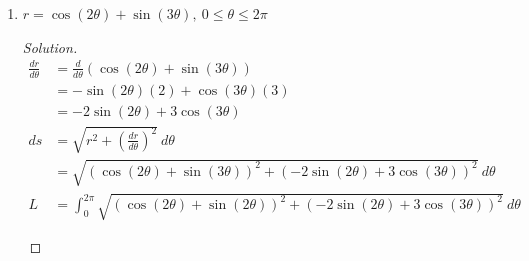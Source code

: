 \documentclass[12pt]{article}
\begin{document}
\begin{enumerate}
			\item[3.] \(\displaystyle r=\cos\left(2\theta\right)+\sin\left(3\theta\right),~0\leq \theta\leq 2\pi\)
			\begin{proof}[Solution]
				\begin{align*}
					\frac{dr}{d\theta} & = \frac{d}{d\theta} \left(\cos\left(2\theta\right)+\sin\left(3\theta\right)\right) \\
					& = -\sin\left(2\theta\right)\left(2\right)+\cos \left(3\theta\right)\left(3\right) \\
					& = -2\sin\left(2\theta\right)+3\cos\left(3\theta\right) \\
					ds & = \sqrt{r^2+\left(\frac{dr}{d\theta}\right)^2}~d\theta \\
					& = \sqrt{\left(\cos\left(2\theta\right)+\sin\left(3\theta\right)\right)^2+\left(-2\sin\left(2\theta\right)+3\cos\left(3\theta\right)\right)^2}~d\theta \\
					L & = \int_0^{2\pi} \sqrt{\left(\cos\left(2\theta\right)+\sin\left(2\theta\right)\right)^2+\left(-2\sin\left(2\theta\right)+3\cos\left(3\theta\right)\right)^2}~d\theta
				\end{align*}
				\begin{center}
				\end{center}
			\end{proof}
		\end{enumerate}
	
\end{document}
